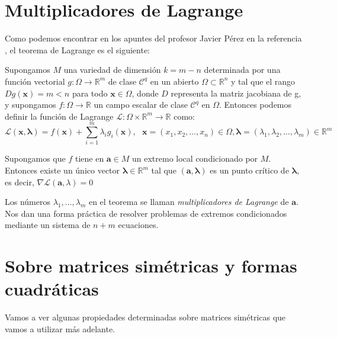 \section{Multiplicadores de Lagrange}

Como podemos encontrar en los apuntes del profesor Javier Pérez en la referencia \cite{jperez}, el teorema de Lagrange es el siguiente:

\begin{definicion}
Supongamos $M$ una variedad de dimensión $k=m-n$ determinada por una función vectorial $g: \Omega \rightarrow \mathbb{R}^m$ de clase $\mathcal{C}^q$ en un abierto $\Omega \subset \mathbb{R}^n$ y tal que el rango $Dg(\mathbf{x}) = m < n$ para todo $\mathbf{x} \in \Omega$, donde $D$ representa la matriz jacobiana de g, y supongamos $f: \Omega \rightarrow \mathbb{R}$ un campo escalar de clase $\mathcal{C}^q$ en $\Omega$. Entonces podemos definir la función de Lagrange $\mathcal{L}: \Omega \times \mathbb{R}^m \rightarrow \mathbb{R}$ como:
\[	\mathcal{L}(\mathbf{x}, \mathbf{\lambda}) = f(\mathbf{x}) + \sum_{i=1}^{m} \lambda_ig_i(\mathbf{x}), \ \ \  \mathbf{x} = (x_1, x_2, \dots, x_n) \in \Omega, \mathbf{\lambda} = (\lambda_1, \lambda_2, \dots, \lambda_m) \in \mathbb{R}^m	\]
\end{definicion}

\begin{teorema}[de Lagrange]
Supongamos que $f$ tiene en $\mathbf{a} \in M$ un extremo local condicionado por $M$. Entonces existe un único vector $\mathbf{\lambda} \in \mathbb{R}^m$ tal que $(\mathbf{a}, \mathbf{\lambda})$ es un punto crítico de $\mathbf{\lambda}$, es decir, $\nabla \mathcal{L}(\mathbf{a}, \mathbb{\lambda}) = 0$
\end{teorema}

Los números $\lambda_1, \dots, \lambda_m$ en el teorema se llaman \textit{multiplicadores de Lagrange} de $\mathbf{a}$. Nos dan una forma práctica de resolver problemas de extremos condicionados mediante un sistema de $n+m$ ecuaciones.

\section{Sobre matrices simétricas y formas cuadráticas}
Vamos a ver algunas propiedades determinadas sobre matrices simétricas que vamos a utilizar más adelante.\\

